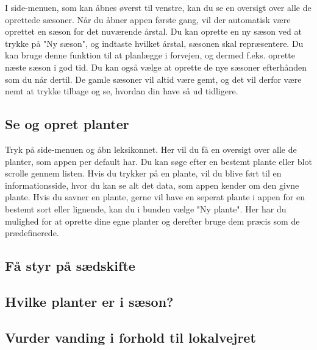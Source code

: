 \begin{minipage}{0.55\textwidth}
I side-menuen, som kan åbnes øverst til venstre, kan du se en oversigt over alle de oprettede sæsoner. Når du åbner appen første gang, vil der automatisk være oprettet en sæson for det nuværende årstal. Du kan oprette en ny sæson ved at trykke på "Ny sæson", og indtaste hvilket årstal, sæsonen skal repræsentere. Du kan bruge denne funktion til at planlægge i forvejen, og dermed f.eks. oprette næste sæson i god tid. Du kan også vælge at oprette de nye sæsoner efterhånden som du når dertil. De gamle sæsoner vil altid være gemt, og det vil derfor være nemt at trykke tilbage og se, hvordan din have så ud tidligere.
\end{minipage} 

\subsection{Se og opret planter}
Tryk på side-menuen og åbn leksikonnet. Her vil du få en oversigt over alle de planter, som appen per default har. Du kan søge efter en bestemt plante eller blot scrolle gennem listen. Hvis du trykker på en plante, vil du blive ført til en informationsside, hvor du kan se alt det data, som appen kender om den givne plante. Hvis du savner en plante, gerne vil have en seperat plante i appen for en bestemt sort eller lignende, kan du i bunden vælge "Ny plante". Her har du mulighed for at oprette dine egne planter og derefter bruge dem præcis som de prædefinerede.

\subsection{Få styr på sædskifte}

\subsection{Hvilke planter er i sæson?}

\subsection{Vurder vanding i forhold til lokalvejret}
